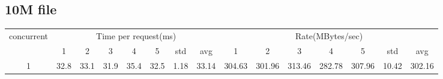 \documentclass{article}
\begin{document}
\subsection*{10M file}
\begin{table}[H]
    \begin{tabular}{|c|c|c|c|c|c|c|c|c|c|c|c|c|c|c|}
        \hline
        \multirow{2}{*}{concurrent} & \multicolumn{7}{c|}{Time per request(ms)} & \multicolumn{7}{c|}{Rate(MBytes/sec)}                                                                                                   \\ \cline{2-15}
                                    & 1                                         & 2                                     & 3    & 4    & 5    & std  & avg   & 1      & 2      & 3      & 4      & 5      & std   & avg    \\ \hline
        1                           & 32.8                                      & 33.1                                  & 31.9 & 35.4 & 32.5 & 1.18 & 33.14 & 304.63 & 301.96 & 313.46 & 282.78 & 307.96 & 10.42 & 302.16 \\ \hline
    \end{tabular}
\end{table}
\end{document}
